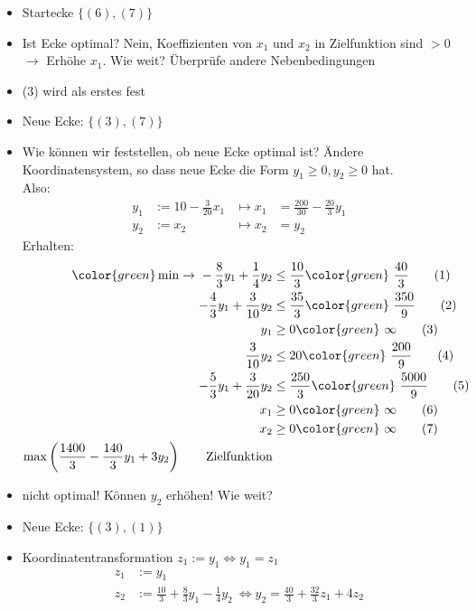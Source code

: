 \begin{itemize}
 \item Startecke $\{(6),(7)\}$
 \item Ist Ecke optimal? Nein, Koeffizienten von $x_1$ und $x_2$ in Zielfunktion sind $> 0$\\
     $\rightarrow$ Erhöhe $x_1$. Wie weit? Überprüfe andere Nebenbedingungen
 \item (3) wird als erstes fest
 \item Neue Ecke: $\{(3),(7)\}$
 \item Wie können wir feststellen, ob neue Ecke optimal ist? Ändere Koordinatensystem, so dass neue Ecke die Form $y_1 \geq 0, y_2 \geq 0$ hat.\\
 Also:
 \begin{align*}
  y_1 &:= 10 - \frac{3}{20} x_1 & \mapsto x_1 &= \frac{200}{30} - \frac{20}{3} y_1 \\
  y_2 &:= x_2 & \mapsto x_2 &= y_2
 \end{align*}
 Erhalten:
\begin{align*}
 {\color{green} \min \rightarrow\ }-\frac{8}{3} y_1 + \frac{1}{4} y_2 &\leq \frac{10}{3} {\color{green}\ \frac{40}{3}} \tag{1} \\
 -\frac{4}{3} y_1 + \frac{3}{10} y_2 &\leq \frac{35}{3} {\color{green}\ \frac{350}{9}} \tag{2} \\
 y_1&\geq 0 {\color{green}\ \infty} \tag{3} \\
 \frac{3}{10} y_2 &\leq 20 {\color{green}\ \frac{200}{9}} \tag{4} \\
 -\frac{5}{3} y_1 + \frac{3}{20} y_2 &\leq \frac{250}{3} {\color{green}\ \frac{5000}{9}} \tag{5} \\
 x_1 &\geq 0 {\color{green}\ \infty} \tag{6} \\
 x_2 &\geq 0 {\color{green}\ \infty} \tag{7} \\
 \max \left(\frac{1400}{3} - \frac{140}{3} y_1 + 3 y_2\right) \tag*{Zielfunktion} 
\end{align*}
\item nicht optimal! Können $y_2$ erhöhen! Wie weit?
\item Neue Ecke: $\{(3),(1)\}$
\item Koordinatentransformation $z_1 := y_1 \Leftrightarrow y_1 = z_1$
    \begin{align*}
     z_1 &:= y_1 \\
     z_2 &:= \frac{10}{3} + \frac{8}{3} y_1 - \frac{1}{4} y_2 \ \Leftrightarrow y_2 = \frac{40}{3} + \frac{32}{3} z_1 + 4 z_2
    \end{align*}

\end{itemize}
